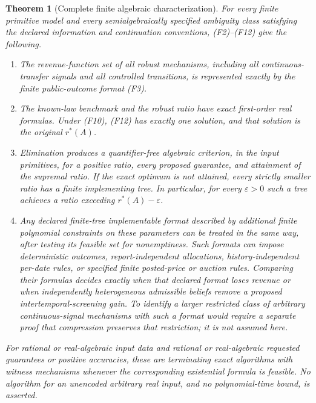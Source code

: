 \documentclass[11pt,a4paper]{article}
\newtheorem{theorem}{Theorem}
\begin{document}
\begin{theorem}[Complete finite algebraic characterization]
\label{thm:algebraic}
For every finite primitive model and every semialgebraically specified
ambiguity class satisfying the declared information and continuation
conventions, \textup{(F2)--(F12)} give the following.
\begin{enumerate}
\item The revenue-function set of all robust mechanisms, including all
continuous-transfer signals and all controlled transitions, is represented
exactly by the finite public-outcome format \textup{(F3)}.
\item The known-law benchmark and the robust ratio have exact first-order
real formulas. Under \textup{(F10)}, \textup{(F12)} has exactly one solution,
and that solution is the original $r^*(A)$.
\item Elimination produces a quantifier-free algebraic criterion, in the
input primitives, for a positive ratio, every proposed guarantee, and
attainment of the supremal ratio. If the exact optimum is not attained,
every strictly smaller ratio has a finite implementing tree. In particular,
for every $\varepsilon>0$ such a tree achieves a ratio exceeding
$r^*(A)-\varepsilon$.
\item Any declared finite-tree implementable format described by additional
finite polynomial constraints on these parameters can be treated in the
same way, after testing its feasible set for nonemptiness. Such formats
can impose deterministic outcomes, report-independent allocations,
history-independent per-date rules, or specified finite posted-price
or auction rules. Comparing their formulas decides exactly when that
declared format loses revenue or when independently heterogeneous
admissible beliefs remove a proposed intertemporal-screening gain.
To identify a larger restricted class of arbitrary continuous-signal
mechanisms with such a format would require a separate proof that
compression preserves that restriction; it is not assumed here.
\end{enumerate}
For rational or real-algebraic input data and rational or real-algebraic
requested guarantees or positive accuracies, these are terminating exact
algorithms with witness mechanisms whenever the corresponding
existential formula is feasible. No algorithm for an unencoded arbitrary
real input, and no polynomial-time bound, is asserted.
\end{theorem}
\end{document}
